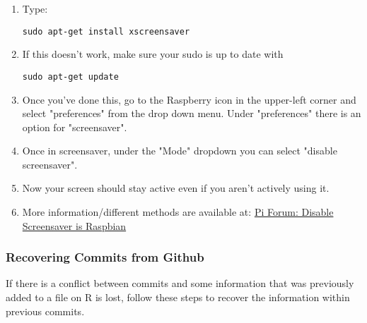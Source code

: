 \documentclass{article}\usepackage[]{graphicx}\usepackage[]{color}
\begin{document}
\begin{enumerate}

\item Type: 

\begin{lstlisting}
sudo apt-get install xscreensaver
\end{lstlisting}

\item If this doesn't work, make sure your sudo is up to date with 
\begin{lstlisting}
sudo apt-get update
\end{lstlisting}

\item Once you've done this, go to the Raspberry icon in the upper-left corner and select "preferences" from the drop down menu.  Under "preferences" there is an option for "screensaver".

\item Once in screensaver, under the "Mode" dropdown you can select "disable screensaver".

\item Now your screen should stay active even if you aren't actively using it.

\item More information/different methods are available at: \href{https://www.raspberrypi.org/forums/viewtopic.php?f=91&t=57552}{Pi Forum:  Disable Screensaver is Raspbian}

\end{enumerate}


\subsubsection{Recovering Commits from Github}

If there is a conflict between commits and some information that was previously added to a file on R is lost, follow these steps to recover the information within previous commits.
\end{document}
